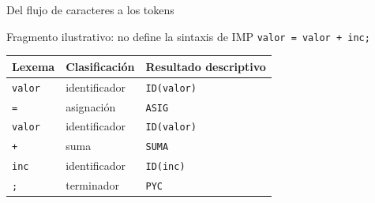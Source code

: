 \documentclass[11pt,spanish]{beamer}
\begin{document}
\begin{frame}{Del flujo de caracteres a los tokens}
\vfill

\begin{block}{Fragmento ilustrativo: no define la sintaxis de \textsc{IMP}}
\centering
\texttt{valor = valor + inc;}
\end{block}

\bigskip

\begin{center}
\small
\renewcommand{\arraystretch}{1.18}
\begin{tabular}{|L{.22\textwidth}|L{.27\textwidth}|L{.35\textwidth}|}
\hline
\textbf{Lexema} & \textbf{Clasificación} & \textbf{Resultado descriptivo} \tabularnewline
\hline
\texttt{valor} & identificador & \texttt{ID(valor)} \tabularnewline
\hline
\texttt{=} & asignación & \texttt{ASIG} \tabularnewline
\hline
\texttt{valor} & identificador & \texttt{ID(valor)} \tabularnewline
\hline
\texttt{+} & suma & \texttt{SUMA} \tabularnewline
\hline
\texttt{inc} & identificador & \texttt{ID(inc)} \tabularnewline
\hline
\texttt{;} & terminador & \texttt{PYC} \tabularnewline
\hline
\end{tabular}
\end{center}

\vfill
\end{frame}
\end{document}
